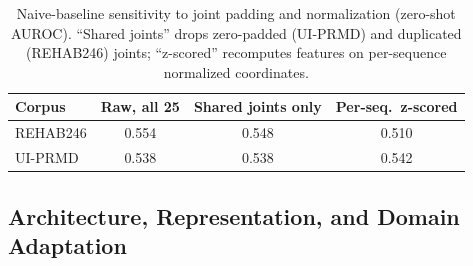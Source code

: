 \documentclass[10pt,journal]{IEEEtran}
\begin{document}
\begin{table}[t]
\centering
\caption{Naive-baseline sensitivity to joint padding and normalization (zero-shot AUROC). ``Shared joints'' drops zero-padded (UI-PRMD) and duplicated (REHAB246) joints; ``z-scored'' recomputes features on per-sequence normalized coordinates.}
\label{tab:naive-sens}
\begin{tabular}{lccc}
\toprule
Corpus & Raw, all 25 & Shared joints only & Per-seq.\ z-scored \\
\midrule
REHAB246 & 0.554 & 0.548 & 0.510 \\
UI-PRMD  & 0.538 & 0.538 & 0.542 \\
\bottomrule
\end{tabular}
\end{table}

\subsection{Architecture, Representation, and Domain Adaptation}
\label{sec:robustness-c}
\end{document}
